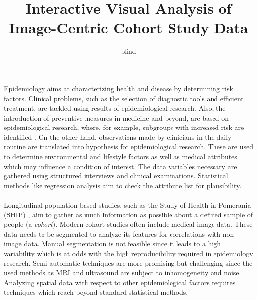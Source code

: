 \documentclass[journal]{style/vgtc} 			          %
\title{Interactive Visual Analysis of Image-Centric Cohort Study Data}
\author{--blind--}
\begin{document}


\maketitle

Epidemiology aims at characterizing health and disease by determining risk factors.
%
Clinical problems, such as the selection of diagnostic tools and efficient treatment, are tackled using results of epidemiological research.
%
Also, the introduction of preventive measures in medicine and beyond, are based on epidemiological research, where, for example, subgroups with increased risk are identified \cite{Fletcher2012}.
%
On the other hand, observations made by clinicians in the daily routine are translated into hypothesis for epidemiological research.
%
These are used to determine environmental and lifestyle factors as well as medical attributes which may influence a condition of interest.
%
The data variables necessary are gathered using structured interviews and clinical examinations.
%
Statistical methods like regression analysis aim to check the attribute list for plausibility.
%
\\\\
Longitudinal population-based studies, such as the Study of Health in Pomerania (SHIP) \cite{Volzke2011}, aim to gather as much information as possible about a defined sample of people (a \emph{cohort}).
%
%
Modern cohort studies often include medical image data.
%
These data needs to be segmented to analyze its features for correlations with non-image data.
%
Manual segmentation is not feasible since it leads to a high variability which is at odds with the high reproducibility required in epidemiology research.
%
Semi-automatic techniques are more promising but challenging since the used methods as MRI and ultrasound are subject to inhomogeneity and noise.
%
Analyzing spatial data with respect to other epidemiological factors requires techniques which reach beyond standard statistical methods.
\end{document}
